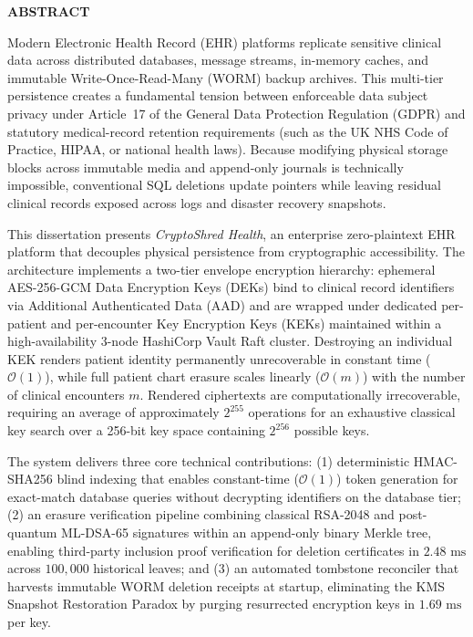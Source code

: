 \thispagestyle{abstractpagestyle}

\vspace*{24pt}

\begin{center}
    \textbf{\fontsize{18pt}{22pt} \selectfont ABSTRACT}
\end{center}

\vspace{16pt}

Modern Electronic Health Record (EHR) platforms replicate sensitive clinical data across distributed databases, message streams, in-memory caches, and immutable Write-Once-Read-Many (WORM) backup archives. This multi-tier persistence creates a fundamental tension between enforceable data subject privacy under Article~17 of the General Data Protection Regulation (GDPR) and statutory medical-record retention requirements (such as the UK NHS Code of Practice, HIPAA, or national health laws). Because modifying physical storage blocks across immutable media and append-only journals is technically impossible, conventional SQL deletions update pointers while leaving residual clinical records exposed across logs and disaster recovery snapshots.

This dissertation presents \textit{CryptoShred Health}, an enterprise zero-plaintext EHR platform that decouples physical persistence from cryptographic accessibility. The architecture implements a two-tier envelope encryption hierarchy: ephemeral AES-256-GCM Data Encryption Keys (DEKs) bind to clinical record identifiers via Additional Authenticated Data (AAD) and are wrapped under dedicated per-patient and per-encounter Key Encryption Keys (KEKs) maintained within a high-availability 3-node HashiCorp Vault Raft cluster. Destroying an individual KEK renders patient identity permanently unrecoverable in constant time ($\mathcal{O}(1)$), while full patient chart erasure scales linearly ($\mathcal{O}(m)$) with the number of clinical encounters $m$. Rendered ciphertexts are computationally irrecoverable, requiring an average of approximately $2^{255}$ operations for an exhaustive classical key search over a 256-bit key space containing $2^{256}$ possible keys.

The system delivers three core technical contributions: (1) deterministic HMAC-SHA256 blind indexing that enables constant-time ($\mathcal{O}(1)$) token generation for exact-match database queries without decrypting identifiers on the database tier; (2) an erasure verification pipeline combining classical RSA-2048 and post-quantum ML-DSA-65 signatures within an append-only binary Merkle tree, enabling third-party inclusion proof verification for deletion certificates in $2.48\text{~ms}$ across $100{,}000$ historical leaves; and (3) an automated tombstone reconciler that harvests immutable WORM deletion receipts at startup, eliminating the KMS Snapshot Restoration Paradox by purging resurrected encryption keys in $1.69\text{~ms}$ per key.

